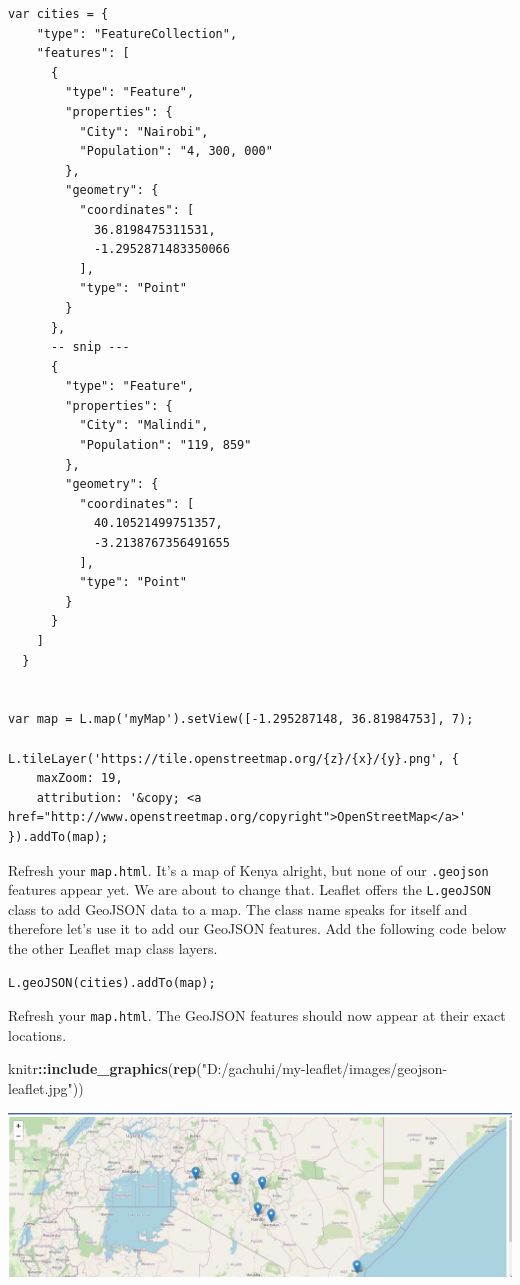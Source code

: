 \documentclass[
]{book}
\newenvironment{Shaded}{\begin{snugshade}}{\end{snugshade}}
\newcommand{\FunctionTok}[1]{\textcolor[rgb]{0.13,0.29,0.53}{\textbf{#1}}}
\newcommand{\NormalTok}[1]{#1}
\newcommand{\SpecialCharTok}[1]{\textcolor[rgb]{0.81,0.36,0.00}{\textbf{#1}}}
\newcommand{\StringTok}[1]{\textcolor[rgb]{0.31,0.60,0.02}{#1}}
\begin{document}
\begin{verbatim}
var cities = {
    "type": "FeatureCollection",
    "features": [
      {
        "type": "Feature",
        "properties": {
          "City": "Nairobi",
          "Population": "4, 300, 000"
        },
        "geometry": {
          "coordinates": [
            36.8198475311531,
            -1.2952871483350066
          ],
          "type": "Point"
        }
      },
      -- snip ---
      {
        "type": "Feature",
        "properties": {
          "City": "Malindi",
          "Population": "119, 859"
        },
        "geometry": {
          "coordinates": [
            40.10521499751357,
            -3.2138767356491655
          ],
          "type": "Point"
        }
      }
    ]
  }


var map = L.map('myMap').setView([-1.295287148, 36.81984753], 7);

L.tileLayer('https://tile.openstreetmap.org/{z}/{x}/{y}.png', {
    maxZoom: 19,
    attribution: '&copy; <a href="http://www.openstreetmap.org/copyright">OpenStreetMap</a>'
}).addTo(map);
\end{verbatim}

Refresh your \texttt{map.html}. It's a map of Kenya alright, but none of our \texttt{.geojson} features appear yet. We are about to change that. Leaflet offers the \texttt{L.geoJSON} class to add GeoJSON data to a map. The class name speaks for itself and therefore let's use it to add our GeoJSON features. Add the following code below the other Leaflet map class layers.

\begin{verbatim}
L.geoJSON(cities).addTo(map);
\end{verbatim}

Refresh your \texttt{map.html}. The GeoJSON features should now appear at their exact locations.

\begin{Shaded}
\begin{Highlighting}[]
\NormalTok{knitr}\SpecialCharTok{::}\FunctionTok{include\_graphics}\NormalTok{(}\FunctionTok{rep}\NormalTok{(}\StringTok{"D:/gachuhi/my{-}leaflet/images/geojson{-}leaflet.jpg"}\NormalTok{))}
\end{Highlighting}
\end{Shaded}

\includegraphics{../images/geojson-leaflet.jpg}
\end{document}
